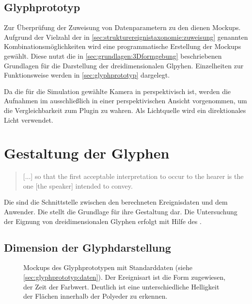 \subsection*{Glyphprototyp}
Zur Überprüfung der Zuweisung von Datenparametern zu den  dienen Mockups. Aufgrund der Vielzahl der in \autoref{sec:strukturereignistaxonomie:zuweisung} genannten Kombinationsmöglichkeiten wird eine programmatische Erstellung der Mockups gewählt. Diese nutzt die in \autoref{sec:grundlagen:3Dformgebung} beschriebenen Grundlagen für die Darstellung der dreidimensionalen Glpyhen. Einzelheiten zur Funktionsweise werden in \autoref{sec:glyphprototyp} dargelegt.

Da die für die Simulation gewählte Kamera in  perspektivisch ist, werden die Aufnahmen im  ausschließlich in einer perspektivischen Ansicht vorgenommen, um die Vergleichbarkeit zum Plugin zu wahren. Als Lichtquelle wird ein direktionales Licht verwendet.


\section{Gestaltung der Glyphen}\label{sec:visualisierung:glyphen}
\blockcquote[64]{infantidou2001evidentials}{[...] so that the first acceptable interpretation to occur to the hearer is the one [the speaker] intended to convey.}

Die  sind die Schnittstelle zwischen den berechneten Ereignisdaten und dem Anwender. Die  stellt die Grundlage für ihre Gestaltung dar. Die Untersuchung der Eignung von dreidimensionalen Glyphen erfolgt mit Hilfe des .

\subsection*{Dimension der Glyphdarstellung}\label{sec:visualisierung:glyphen3d}

\begin{figure}
	{\caption{Mockups des Glyphprototypen mit Standarddaten (siehe \autoref{sec:glyphprototyp:daten}). Der Ereignisart ist die Form zugewiesen, der Zeit der Farbwert. Deutlich ist eine unterschiedliche Helligkeit der Flächen innerhalb der Polyeder zu erkennen.}\label{fig:vis:mockup-form}}
\end{figure}


